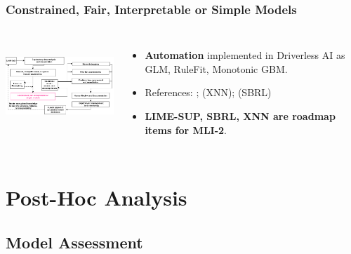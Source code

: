 \documentclass[11pt,
               aspectratio=169,
               hyperref={colorlinks}
               ]{beamer}
\begin{document}
			\begin{frame}
		
				\frametitle{Constrained, Fair, Interpretable or Simple Models}		
			
				\begin{columns}
	
					\centering
					\includegraphics[height=100pt]{img/im.png}
				
					\vspace{-5pt}
					\begin{itemize}
						\item \textbf{Automation} implemented in Driverless AI as GLM, RuleFit, Monotonic GBM.
						\item References: ;  (XNN); 	 (SBRL)		
						\item \textbf{LIME-SUP, SBRL, XNN are roadmap items for MLI-2}.
					\end{itemize}
				
				\end{columns}			
			
			\end{frame}

	\section{Post-Hoc Analysis}

		\subsection{Model Assessment}
\end{document}
